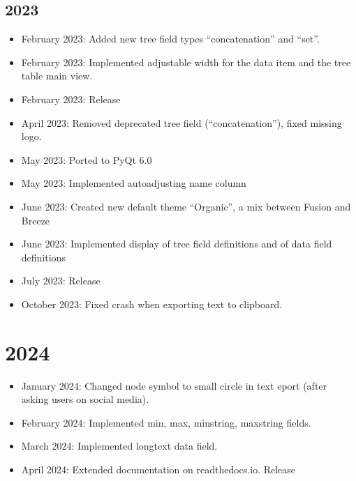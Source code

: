 \documentclass[letterpaper,10pt,english]{sphinxmanual}
\begin{document}
\subsection{2023}
\label{\detokenize{releases:id9}}\begin{itemize}
\item {} 
\sphinxAtStartPar
February 2023: Added new tree field types “concatenation” and “set”.

\item {} 
\sphinxAtStartPar
February 2023: Implemented adjustable width for the data item and the tree table main view.

\item {} 
\sphinxAtStartPar
February 2023: Release 

\item {} 
\sphinxAtStartPar
April 2023: Removed deprecated tree field (“concatenation”), fixed missing logo.

\item {} 
\sphinxAtStartPar
May 2023: Ported to PyQt 6.0

\item {} 
\sphinxAtStartPar
May 2023: Implemented auto\sphinxhyphen{}adjusting name column

\item {} 
\sphinxAtStartPar
June 2023: Created new default theme “Organic”, a mix between Fusion and Breeze

\item {} 
\sphinxAtStartPar
June 2023: Implemented display of tree field definitions and of data field definitions

\item {} 
\sphinxAtStartPar
July 2023: Release 

\item {} 
\sphinxAtStartPar
October 2023: Fixed crash when exporting text to clipboard.

\end{itemize}


\section{2024}
\label{\detokenize{releases:id10}}\begin{itemize}
\item {} 
\sphinxAtStartPar
January 2024: Changed node symbol to small circle in text eport (after asking users on social media).

\item {} 
\sphinxAtStartPar
February 2024: Implemented min, max, min\sphinxhyphen{}string, max\sphinxhyphen{}string fields.

\item {} 
\sphinxAtStartPar
March 2024: Implemented longtext data field.

\item {} 
\sphinxAtStartPar
April 2024: Extended documentation on readthedocs.io. Release 

\end{itemize}
\end{document}
